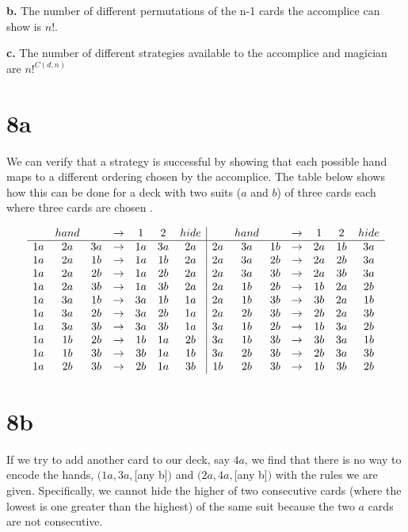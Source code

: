 \documentclass[12pt]{article}
\begin{document}
{\bf b.} The number of different permutations of the n-1 cards the
accomplice can show is $n!$.

{\bf c.} The number of different strategies available to the
accomplice and magician are $n!^{C(d,n)}$

\section*{8a}

We can verify that a strategy is successful by showing that each
possible hand maps to a different ordering chosen by the
accomplice. The table below shows how this can be done for a deck
with two suits ($a$ and $b$) of three cards each where three cards
are chosen .

$$\begin{array} {ccc c ccc | ccc c ccc}
    &hand& &\rightarrow& 1&2&hide & &hand& &\rightarrow& 1&2&hide\\ \hline
    1a&2a&3a &\rightarrow& 1a&3a&2a & 2a&3a&1b &\rightarrow& 2a&1b&3a \\
    1a&2a&1b &\rightarrow& 1a&1b&2a & 2a&3a&2b &\rightarrow& 2a&2b&3a \\
    1a&2a&2b &\rightarrow& 1a&2b&2a & 2a&3a&3b &\rightarrow& 2a&3b&3a \\
    1a&2a&3b &\rightarrow& 1a&3b&2a & 2a&1b&2b &\rightarrow& 1b&2a&2b \\
    1a&3a&1b &\rightarrow& 3a&1b&1a & 2a&1b&3b &\rightarrow& 3b&2a&1b \\
    1a&3a&2b &\rightarrow& 3a&2b&1a & 2a&2b&3b &\rightarrow& 2b&2a&3b \\
    1a&3a&3b &\rightarrow& 3a&3b&1a & 3a&1b&2b &\rightarrow& 1b&3a&2b \\
    1a&1b&2b &\rightarrow& 1b&1a&2b & 3a&1b&3b &\rightarrow& 3b&3a&1b \\
    1a&1b&3b &\rightarrow& 3b&1a&1b & 3a&2b&3b &\rightarrow& 2b&3a&3b \\
    1a&2b&3b &\rightarrow& 2b&1a&3b & 1b&2b&3b &\rightarrow& 1b&3b&2b
  \end{array}$$

\section*{8b}

If we try to add another card to our deck, say $4a$, we find that
there is no way to encode the hands, $(1a,3a,$[any b]$)$ and
$(2a,4a,$[any b]$)$ with the rules we are given. Specifically, we
cannot hide the higher of two consecutive cards (where the lowest
is one greater than the highest) of the same suit because the two
$a$ cards are not consecutive.
\end{document}
